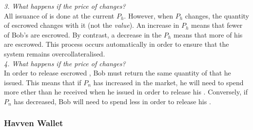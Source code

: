 \noindent \emph{3. What happens if the price of \HAV{} changes?} \\

\noindent All issuance of \NOM{} is done at the current $P_h$. However, when $P_h$ changes, the quantity of escrowed \HAV{} changes with it (not the \emph{value}). An increase in $P_h$ means that fewer of Bob's \HAV{} are escrowed. By contrast, a decrease in the $P_h$ means that more of his \HAV{} are escrowed. This process occurs automatically in order to ensure that the system remains overcollateralised. \\ 

\noindent \emph{4. What happens if the price of \NOM{} changes?} \\ 

\noindent In order to release escrowed \HAV{}, Bob must return the same quantity of \NOM{} that he issued. This means that if $P_n$ has increased in the market, he will need to spend more ether than he received when he issued in order to release his \HAV{}. Conversely, if $P_n$ has decreased, Bob will need to spend less in order to release his \HAV{}.

\subsubsection{Havven Wallet}


\newpage
